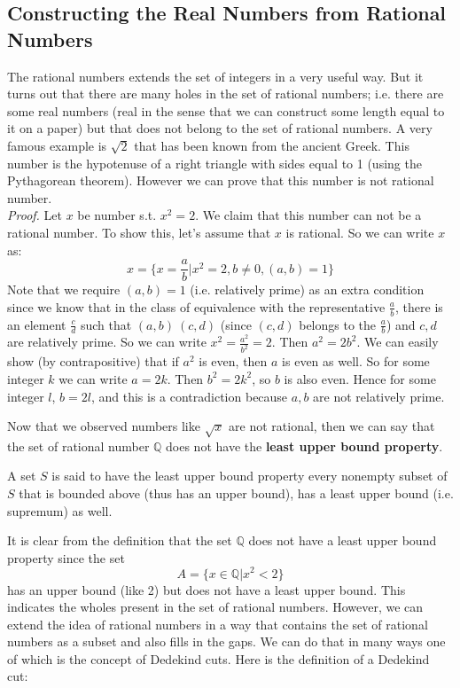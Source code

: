 \subsection{Constructing the Real Numbers from Rational Numbers}

The rational numbers extends the set of integers in a very useful way. But it turns out that there are many holes in the set of rational numbers; i.e. there are some real numbers (real in the sense that we can construct some length equal to it on a paper) but that does not belong to the set of rational numbers. A very famous example is $\sqrt{2}$ that has been known from the ancient Greek. This number is the hypotenuse of a right triangle with sides equal to 1 (using the Pythagorean theorem). However we can prove that this number is not rational number.  \\

\textit{Proof.} Let $x$ be number s.t. $x^2 = 2$. We claim that this number can not be a rational number. To show this, let's assume that $x$ is rational. So we can write $x$ as: 
\[ x = \{ x = \frac{a}{b} | x^2 = 2, b \neq 0,  (a,b) = 1 \}  \]
Note that we require $(a,b)=1$ (i.e. relatively prime) as an extra condition since we know that in the class of equivalence with the representative $\frac{a}{b}$, there is an element $\frac{c}{d}$ such that $(a,b) ~ (c,d) $ (since $(c,d)$ belongs to the $\frac{a}{b}$) and $c,d$ are relatively prime. So we can write $x^2 = \frac{a^2}{b^2} = 2$. Then $a^2 = 2 b^2$. We can easily show (by contrapositive) that if $a^2$ is even, then $a$ is even as well. So for some integer $k$ we can write $a = 2k$. Then $b^2 = 2 k^2$, so $b$ is also even. Hence for some integer $l$, $b = 2l$, and this is a contradiction because $a,b$ are not relatively prime.

Now that we observed numbers like $\sqrt{x}$ are not rational, then we can say that the set of rational number $\mathbb{Q}$ does not have the \textbf{least upper bound property}.

\begin{defbox}
	A set $S$ is said to have the least upper bound property every nonempty subset of $S$ that is bounded above (thus has an upper bound), has a least upper bound (i.e. supremum) as well. 
\end{defbox}

It is clear from the definition that the set $\mathbb{Q}$ does not have a least upper bound property since the set  \[A =\{ x \in \mathbb{Q} | x^2 < 2 \} \]has an upper bound (like 2) but does not have a least upper bound. This indicates the wholes present in the set of rational numbers. However, we can extend the idea of rational numbers in a way that contains the set of rational numbers as a subset and also fills in the gaps. We can do that in many ways one of which is the concept of Dedekind cuts. Here is the definition of a Dedekind cut:

